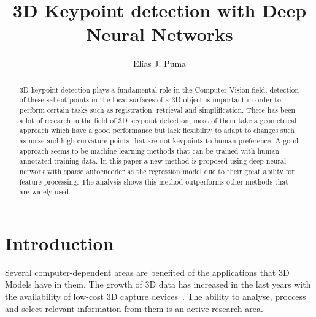 \documentclass{comjnl}
\begin{document}
\title[Modelling Bidders in Sequential Automated Auctions]{3D Keypoint detection with Deep Neural Networks}
\author{El\'{i}as J. Puma}






\begin{abstract}
3D keypoint detection plays a fundamental role in the Computer Vision field, detection of these salient points in the local surfaces of a 3D object is important in order to perform certain tasks such as registration, retrieval and simplification. There has been a lot of research in the field of 3D keypoint detection, most of them take a geometrical approach which have a good performance but lack flexibility to adapt to changes such as noise and high curvature points that are not keypoints to human preference. A good approach seems to be machine learning methods that can be trained with human annotated training data. In this paper a new method is proposed using deep neural network with sparse autoencoder as the regression model due to their great ability for feature processing. The analysis shows this method outperforms other methods that are widely used.  
\end{abstract}

\maketitle


\section{Introduction}
Several computer-dependent areas are benefited of the applications
that 3D Models have in them. The growth of 3D data has increased in
the last years with the availability of low-cost 3D capture devices~\cite{harris3D}.
The ability to analyse, proccess and select relevant information
from them is an active research area. 
\end{document}
